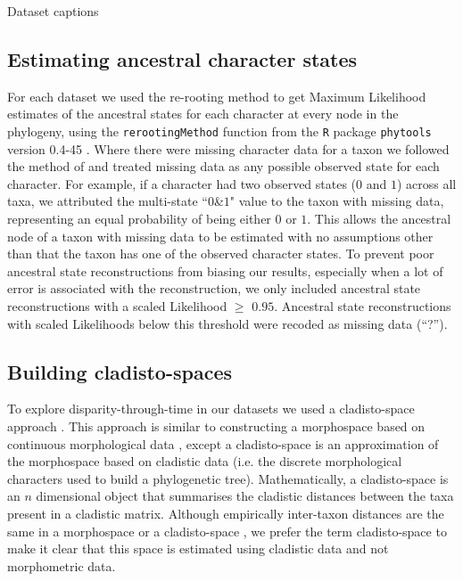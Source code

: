 \documentclass[12pt,a4paper]{article}
\begin{document}
  \begin{table}[!htbp]      
    \caption[Datasets.]
    {Dataset captions}
     
    \label{tab:data}  
  \end{table}

\subsection{Estimating ancestral character states}
\label{ace}
For each dataset we used the re-rooting method \citep{Yang01121995,Garland2000} to get Maximum Likelihood estimates of the ancestral states for each character at every node in the phylogeny, using the \texttt{rerootingMethod} function from the \texttt{R} package \texttt{phytools} version 0.4-45 \citep{phytools,R}. %
Where there were missing character data for a taxon we followed the method of \cite{Claddis} and treated missing data as any possible observed state for each character.
For example, if a character had two observed states ($0$ and $1$) across all taxa, we attributed the multi-state ``$0$\&$1$" value to the taxon with missing data, representing an equal probability of being either $0$ or $1$.
This allows the ancestral node of a taxon with missing data to be estimated with no assumptions other than that the taxon has one of the observed character states.
To prevent poor ancestral state reconstructions from biasing our results, especially when a lot of error is associated with the reconstruction, we only included ancestral state reconstructions with a scaled Likelihood $\geq$ $0.95$.
Ancestral state reconstructions with scaled Likelihoods below this threshold were recoded as missing data (``?'').

\subsection{Building cladisto-spaces} 
To explore disparity-through-time in our datasets we used a cladisto-space approach \citep[e.g.][]{Foote01071994,Foote29111996,Wesley-Hunt2005,Brusatte12092008,friedmanexplosive2010,toljagictriassic-jurassic2013,Hughes20082013}.
This approach is similar to constructing a morphospace based on continuous morphological data \citep[e.g.][]{friedmanexplosive2010}, except a cladisto-space is an approximation of the morphospace based on cladistic data (i.e. the discrete morphological characters used to build a phylogenetic tree).
Mathematically, a cladisto-space is an $n$ dimensional object that summarises the cladistic distances between the taxa present in a cladistic matrix.
Although empirically inter-taxon distances are the same in a morphospace or a cladisto-space \citep{foth2012different,hetherington2015cladistic}, we prefer the term cladisto-space to make it clear that this space is estimated using cladistic data and not morphometric data.
\end{document}

